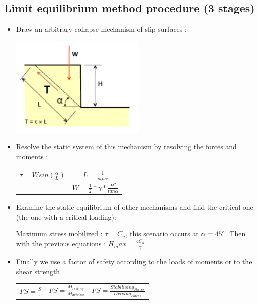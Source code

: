     \newpage
    \subsection{Limit equilibrium method procedure (3 stages)}
        
        \begin{itemize}
            \item Draw an arbitrary collapse mechanism of slip surfaces : 
                
            \includegraphics[scale=1]{Verastegui/images/V16.PNG}
        
            \item Resolve the static system of this mechanism by resolving the forces and moments : 
                \medskip
                \begin{center}
                \begin{tabular}{c|c}
                    $\tau = W sin(\frac{\alpha}{L})$  &  $L = \frac{1}{sin \alpha}$  \\
                                                       &  $W = \frac{1}{2} * \gamma * \frac{H^2}{tan \alpha}$ 
                \end{tabular}
                \end{center}
                
            \item Examine the static equilibrium of other mechanisms and find the critical one (the one with a critical loading):
                
                \medskip
                Maximum stress mobilized : $\tau = C_u$, this scenario occurs at $\alpha = 45\degree$. Then with the previous equations : $H_max = \frac{4 C_u}{\gamma}$.
                
            \item Finally we use a factor of safety according to the loads of moments or to the shear strength. 
                
                \medskip
                \begin{center}
                \begin{tabular}{c|c|c}
                    $FS = \frac{S}{\tau}$  
                    &  $FS = \frac{M_{resting}}{M_{driving}}$                        
                    &  $FS = \frac{Stabilising_{Forces}}{Driving_{Forces}}$ 
                \end{tabular}
                \end{center}
        \end{itemize}
        
